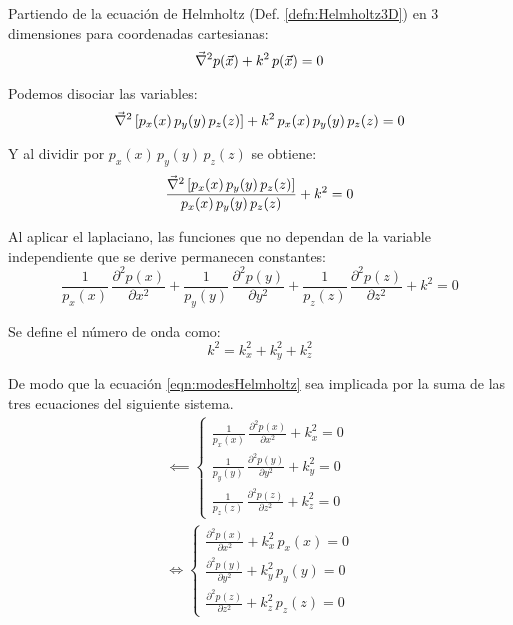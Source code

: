 \documentclass[a5paper,12pt,twoside]{book}
\begin{document}
Partiendo de la ecuación de Helmholtz (Def. \ref{defn:Helmholtz3D}) en 3 dimensiones para coordenadas cartesianas:
\begin{equation*}
    \Vec{\nabla}^2 p(\Vec{x}) + k^2 \, p(\Vec{x}) = 0
\end{equation*}

Podemos disociar las variables:
\begin{equation*}
    \Vec{\nabla}^2 \left[ p_x(x) \, p_y(y) \, p_z(z) \right] + k^2 \, p_x(x) \, p_y(y) \, p_z(z) = 0
\end{equation*}

Y al dividir por $p_x(x) \, p_y(y) \, p_z(z)$ se obtiene:
\begin{equation*}
    \frac{\Vec{\nabla}^2 \left[ p_x(x) \, p_y(y) \, p_z(z) \right]}{p_x(x) \, p_y(y) \, p_z(z)} + k^2 = 0
\end{equation*}

Al aplicar el laplaciano, las funciones que no dependan de la variable independiente que se derive permanecen constantes:
\begin{equation}
    \frac{1}{p_x(x)} \, \frac{\partial^2 p(x)}{\partial x^2}
    + \frac{1}{p_y(y)} \, \frac{\partial^2 p(y)}{\partial y^2}
    + \frac{1}{p_z(z)} \, \frac{\partial^2 p(z)}{\partial z^2}
    + k^2 = 0
    \label{eqn:modesHelmholtz}
\end{equation}

Se define el número de onda como:
\begin{equation}
    k^2 = k_x^2 + k_y^2 + k_z^2
    \label{eqn:modesk^2}
\end{equation}

De modo que la ecuación \ref{eqn:modesHelmholtz} sea implicada por la suma de las tres ecuaciones del siguiente sistema.
\begin{gather*}
    \impliedby
    \left\{
    \begin{aligned}
        \frac{1}{p_x(x)} \, \frac{\partial^2 p(x)}{\partial x^2} + k_x^2 = 0
        \\
        \frac{1}{p_y(y)} \, \frac{\partial^2 p(y)}{\partial y^2} + k_y^2 = 0
        \\
        \frac{1}{p_z(z)} \, \frac{\partial^2 p(z)}{\partial z^2} + k_z^2 = 0
    \end{aligned}
    \right.
    \\
    \iff
    \left\{
    \begin{aligned}
        \frac{\partial^2 p(x)}{\partial x^2} + k_x^2 \, p_x(x) = 0
        \\
        \frac{\partial^2 p(y)}{\partial y^2} + k_y^2 \, p_y(y) = 0
        \\
        \frac{\partial^2 p(z)}{\partial z^2} + k_z^2 \, p_z(z) = 0
    \end{aligned}
    \right.
\end{gather*}
\end{document}
